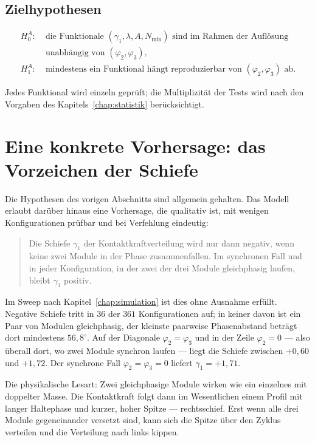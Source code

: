 \documentclass[12pt,a4paper]{report}
\begin{document}
\subsection*{Zielhypothesen}

\begin{align}
  H_{0}^{A} :\;& \text{die Funktionale } (\gamma_1, \lambda, A, N_{\min})
                 \text{ sind im Rahmen der Auflösung} \nonumber\\
               & \text{unabhängig von } (\varphi_2, \varphi_3),
                 \label{eq:h0-a}\\[2pt]
  H_{1}^{A} :\;& \text{mindestens ein Funktional hängt reproduzierbar von }
                 (\varphi_2, \varphi_3) \text{ ab.} \label{eq:h1-a}
\end{align}

Jedes Funktional wird einzeln geprüft; die Multiplizität der Tests wird
nach den Vorgaben des Kapitels~\ref{chap:statistik} berücksichtigt.

\section{Eine konkrete Vorhersage: das Vorzeichen der Schiefe}
\label{sec:vorhersage-schiefe}

Die Hypothesen des vorigen Abschnitts sind allgemein gehalten. Das
Modell erlaubt darüber hinaus eine Vorhersage, die qualitativ ist, mit
wenigen Konfigurationen prüfbar und bei Verfehlung eindeutig:

\begin{quote}
Die Schiefe $\gamma_1$ der Kontaktkraftverteilung wird nur dann negativ,
wenn keine zwei Module in der Phase zusammenfallen. Im synchronen Fall
und in jeder Konfiguration, in der zwei der drei Module gleichphasig
laufen, bleibt $\gamma_1$ positiv.
\end{quote}

Im Sweep nach Kapitel~\ref{chap:simulation} ist dies ohne Ausnahme
erfüllt. Negative Schiefe tritt in $36$ der $361$ Konfigurationen auf;
in keiner davon ist ein Paar von Modulen gleichphasig, der kleinste
paarweise Phasenabstand beträgt dort mindestens $56{,}8^\circ$. Auf der
Diagonale $\varphi_2 = \varphi_3$ und in der Zeile $\varphi_2 = 0$ ---
also überall dort, wo zwei Module synchron laufen --- liegt die Schiefe
zwischen $+0{,}60$ und $+1{,}72$. Der synchrone Fall
$\varphi_2 = \varphi_3 = 0$ liefert $\gamma_1 = +1{,}71$.

Die physikalische Lesart: Zwei gleichphasige Module wirken wie ein
einzelnes mit doppelter Masse. Die Kontaktkraft folgt dann im
Wesentlichen einem Profil mit langer Haltephase und kurzer, hoher
Spitze --- rechtsschief. Erst wenn alle drei Module gegeneinander
versetzt sind, kann sich die Spitze über den Zyklus verteilen und die
Verteilung nach links kippen.
\end{document}
